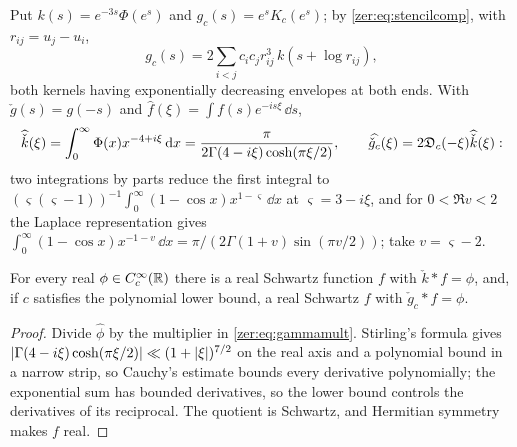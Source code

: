 Put $k(s)=e^{-3s}\Phi(e^s)$ and $g_c(s)=e^sK_c(e^s)$; by \eqref{zer:eq:stencilcomp}, with $r_{ij}=u_j-u_i$,
\begin{equation}\label{zer:eq:logkernel}
 g_c(s)=2\sum_{i<j}c_ic_jr_{ij}^3\,k(s+\log r_{ij}),
\end{equation}
both kernels having exponentially decreasing envelopes at both ends. With $\check g(s)=g(-s)$ and
$\widehat f(\xi)=\int f(s)e^{-is\xi}\,\dd s$,
\begin{equation}\label{zer:eq:gammamult}
 \widehat{\check k}(\xi)=\int_0^\infty\Phi(x)x^{-4+i\xi}\,\mathrm{d} x=\frac\pi{2\Gamma(4-i\xi)\cosh(\pi\xi/2)},\qquad
 \widehat{\check g_c}(\xi)=2\mathfrak{D}_c(-\xi)\widehat{\check k}(\xi):
\end{equation}
two integrations by parts reduce the first integral to $(\varsigma(\varsigma-1))^{-1}\int_0^\infty(1-\cos x)x^{1-\varsigma}\,\dd x$ at
$\varsigma=3-i\xi$, and for $0<\Re v<2$ the Laplace representation gives
$\int_0^\infty(1-\cos x)x^{-1-v}\,\dd x=\pi/(2\Gamma(1+v)\sin(\pi v/2))$; take $v=\varsigma-2$.

\begin{lemma}\label{zer:lem:invert}
For every real $\phi\in C_c^\infty(\mathbb{R})$ there is a real Schwartz function $f$ with $\check k*f=\phi$, and, if $c$
satisfies the polynomial lower bound, a real Schwartz $f$ with $\check g_c*f=\phi$.
\end{lemma}
\begin{proof}
Divide $\widehat\phi$ by the multiplier in \eqref{zer:eq:gammamult}. Stirling's formula gives
$\lvert\Gamma(4-i\xi)\cosh(\pi\xi/2)\rvert\ll(1+\lvert\xi\rvert)^{7/2}$ on the real axis and a polynomial bound in a narrow strip,
so Cauchy's estimate bounds every derivative polynomially; the exponential sum has bounded derivatives, so
the lower bound controls the derivatives of its reciprocal. The quotient is Schwartz, and Hermitian symmetry
makes $f$ real.
\end{proof}

